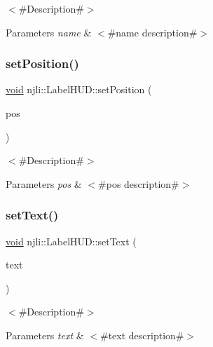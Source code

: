 $<$\#\+Description\#$>$


\begin{DoxyParams}{Parameters}
{\em name} & $<$\#name description\#$>$ \\
\hline
\end{DoxyParams}
\mbox{\label{classnjli_1_1_label_h_u_d_a196a78a5fb764d5e14287d593a442c89}} 
\subsubsection{\texorpdfstring{set\+Position()}{setPosition()}}
{\footnotesize\ttfamily \mbox{\hyperlink{_thread_8h_af1e856da2e658414cb2456cb6f7ebc66}{void}} njli\+::\+Label\+H\+U\+D\+::set\+Position (\begin{DoxyParamCaption}\item[{const bt\+Vector2 \&}]{pos }\end{DoxyParamCaption})}

$<$\#\+Description\#$>$


\begin{DoxyParams}{Parameters}
{\em pos} & $<$\#pos description\#$>$ \\
\hline
\end{DoxyParams}
\mbox{\label{classnjli_1_1_label_h_u_d_aa41b131ee1d33967a5aa23ebbf459387}} 
\subsubsection{\texorpdfstring{set\+Text()}{setText()}}
{\footnotesize\ttfamily \mbox{\hyperlink{_thread_8h_af1e856da2e658414cb2456cb6f7ebc66}{void}} njli\+::\+Label\+H\+U\+D\+::set\+Text (\begin{DoxyParamCaption}\item[{const char $\ast$}]{text }\end{DoxyParamCaption})}

$<$\#\+Description\#$>$


\begin{DoxyParams}{Parameters}
{\em text} & $<$\#text description\#$>$ \\
\hline
\end{DoxyParams}
\mbox{\label{classnjli_1_1_label_h_u_d_a73ffd499fceaacd59b518a541ed2133e}} 

